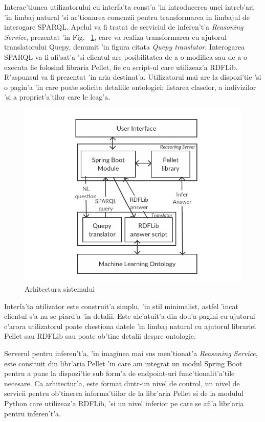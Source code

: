 \documentclass[12pt,a4paper,twoside]{report}
\begin{document}
Interac'tiunea utilizatorului cu interfa'ta const'a 'in introducerea unei intreb'ari 'in limbaj natural 'si ac'tionarea comenzii pentru transformarea in limbajul de interogare SPARQL. Apelul va fi tratat de serviciul de inferen't'a {\it Reasoning Service}, prezentat 'in Fig. ~\ref{fig:arch}, care va realiza transformarea cu ajutorul translatorului Quepy, denumit 'in figura citata {\it Quepy translator}. Interogarea SPARQL va fi afi'sat'a 'si clientul are posibilitatea de a o modifica sau de a o executa fie folosind libraria Pellet, fie cu script-ul care utilizeaz'a RDFLib. R'aspunsul va fi prezentat 'in aria destinat'a. Utilizatorul mai are la dispozi'tie 'si o pagin'a 'in care poate solicita detaliile ontologiei: listarea claselor, a indivizilor 'si a propriet'a'tilor care le leag'a.


\begin{figure}[h!]
    \centering
    \includegraphics[width = 0.75\linewidth]{img/arhitectura-generala-black.png}
        \caption{Arhitectura sistemului}
    \label{fig:arch}
\end{figure}

Interfa'ta utilizator este construit'a simplu, 'in stil minimalist, astfel 'incat clientul s'a nu se piard'a 'in detalii. Este alc'atuit'a din dou'a pagini cu ajutorul c'arora utilizatorul poate chestiona datele 'in limbaj natural cu ajutorul librariei Pellet sau RDFLib sau poate ob'tine detalii despre ontologie. 

Serverul pentru inferen't'a, 'in imaginea mai sus men'tionat'a {\it Reasoning Service}, este consituit din libr'aria Pellet 'in care am integrat un modul Spring Boot pentru a pune la dispozi'tie sub form'a de endpoint-uri func'tionalit'a'tile necesare. Ca arhitectur'a, este format dintr-un nivel de control, un nivel de  servicii pentru ob'tinerea informa'tiilor de la libr'aria Pellet si de la modulul Python care utilizeaz'a RDFLib, 'si un nivel inferior pe care se afl'a libr'aria pentru inferen't'a.
\end{document}
